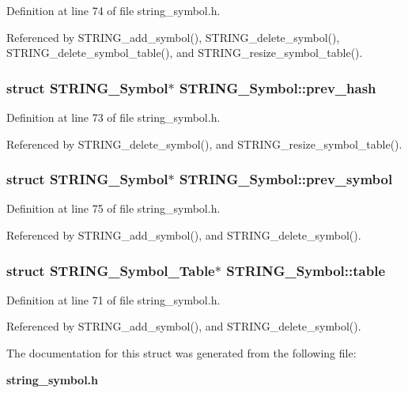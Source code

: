 Definition at line 74 of file string\_\-symbol.h.

Referenced by STRING\_\-add\_\-symbol(), STRING\_\-delete\_\-symbol(), STRING\_\-delete\_\-symbol\_\-table(), and STRING\_\-resize\_\-symbol\_\-table().
\subsubsection{\setlength{\rightskip}{0pt plus 5cm}struct \bf{STRING\_\-Symbol}$\ast$ \bf{STRING\_\-Symbol::prev\_\-hash}}\label{structSTRING__Symbol_5fd1fc46dca1dda1059e478126a1cd4a}




Definition at line 73 of file string\_\-symbol.h.

Referenced by STRING\_\-delete\_\-symbol(), and STRING\_\-resize\_\-symbol\_\-table().
\subsubsection{\setlength{\rightskip}{0pt plus 5cm}struct \bf{STRING\_\-Symbol}$\ast$ \bf{STRING\_\-Symbol::prev\_\-symbol}}\label{structSTRING__Symbol_0581b259e52783e91a242a34cc7936e1}




Definition at line 75 of file string\_\-symbol.h.

Referenced by STRING\_\-add\_\-symbol(), and STRING\_\-delete\_\-symbol().
\subsubsection{\setlength{\rightskip}{0pt plus 5cm}struct \bf{STRING\_\-Symbol\_\-Table}$\ast$ \bf{STRING\_\-Symbol::table}}\label{structSTRING__Symbol_83cc5aef0aef611fb01250d43e163055}




Definition at line 71 of file string\_\-symbol.h.

Referenced by STRING\_\-add\_\-symbol(), and STRING\_\-delete\_\-symbol().

The documentation for this struct was generated from the following file:\begin{CompactItemize}
\item 
\bf{string\_\-symbol.h}\end{CompactItemize}
